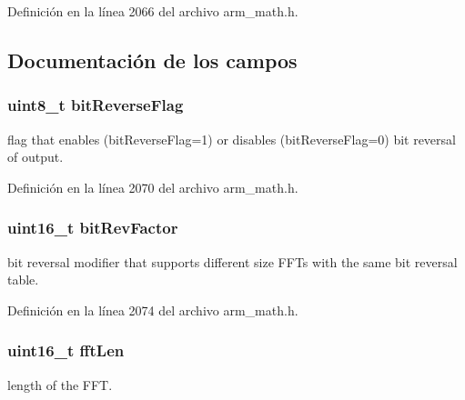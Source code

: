 Definición en la línea 2066 del archivo arm\+\_\+math.\+h.



\subsection{Documentación de los campos}
\subsubsection[{\texorpdfstring{bit\+Reverse\+Flag}{bitReverseFlag}}]{\setlength{\rightskip}{0pt plus 5cm}uint8\+\_\+t bit\+Reverse\+Flag}\hypertarget{structarm__cfft__radix2__instance__f32_a09a221a818c6d0e064557a99e2fe9a8b}{}\label{structarm__cfft__radix2__instance__f32_a09a221a818c6d0e064557a99e2fe9a8b}
flag that enables (bit\+Reverse\+Flag=1) or disables (bit\+Reverse\+Flag=0) bit reversal of output. 

Definición en la línea 2070 del archivo arm\+\_\+math.\+h.

\subsubsection[{\texorpdfstring{bit\+Rev\+Factor}{bitRevFactor}}]{\setlength{\rightskip}{0pt plus 5cm}uint16\+\_\+t bit\+Rev\+Factor}\hypertarget{structarm__cfft__radix2__instance__f32_a33386d95319dc3ee7097b3a8e52e01ec}{}\label{structarm__cfft__radix2__instance__f32_a33386d95319dc3ee7097b3a8e52e01ec}
bit reversal modifier that supports different size F\+F\+Ts with the same bit reversal table. 

Definición en la línea 2074 del archivo arm\+\_\+math.\+h.

\subsubsection[{\texorpdfstring{fft\+Len}{fftLen}}]{\setlength{\rightskip}{0pt plus 5cm}uint16\+\_\+t fft\+Len}\hypertarget{structarm__cfft__radix2__instance__f32_ab8db3bbe7c61e6bb8ca2a55e3446e11a}{}\label{structarm__cfft__radix2__instance__f32_ab8db3bbe7c61e6bb8ca2a55e3446e11a}
length of the F\+FT. 

